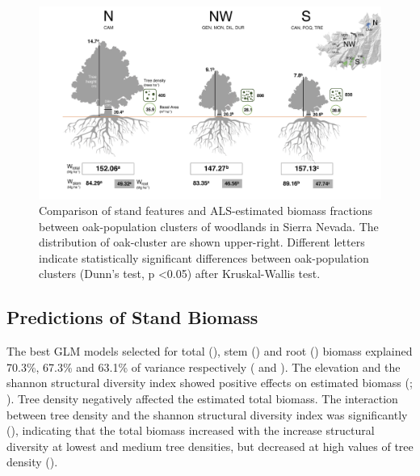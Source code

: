 \begin{figure}
    \centering
    \includegraphics[width=\textwidth]{img/carbon/carbon-esquema-compara2.jpg}
    \caption{Comparison of stand features and ALS-estimated biomass fractions between oak-population clusters of \Qpy woodlands in Sierra Nevada. The distribution of oak-cluster are shown upper-right. Different letters indicate statistically significant differences between oak-population clusters (Dunn's test, p \textless 0.05) after Kruskal-Wallis test.}
    \label{fig:carbon:schema}
\end{figure}

\subsection{Predictions of Stand Biomass}\label{sec:carbon:results-prediction}
The best GLM models selected for total (\wt), stem (\ws) and root (\wro) biomass explained 70.3\%, 67.3\% and 63.1\% of variance respectively ( and ). The elevation and the shannon structural diversity index showed positive effects on estimated biomass (; ). Tree density negatively affected the estimated total biomass. The interaction between tree density and the shannon structural diversity index was significantly (), indicating that the total biomass increased with the increase structural diversity at lowest and medium tree densities, but decreased at high values of tree density ().

